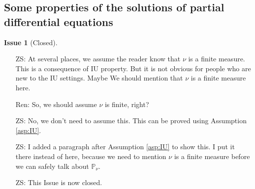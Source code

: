 \documentclass[12pt,a4paper]{amsart}
\numberwithin{equation}{section}
\theoremstyle{plain}
\theoremstyle{definition}
\newtheorem{iss}{Issue}
\begin{document}
\subsection{Some properties of the solutions of partial differential equations}
\begin{iss}[Closed]~
  \begin{itemize}
  \item[ZS:]
At several places, we assume the reader know that $\nu$ is a finite measure. This is a consequence of IU property. But it is not obvious for people who are new to the IU settings. Maybe We should mention that $\nu$ is a finite measure here.

\item[Ren:] 
So, we should assume  $\nu$ is finite, right?
\item[ZS:]
No, we don't need to assume this. 
This can be proved using Assumption \ref{asp:IU}.
\item[ZS:]
I added a paragraph after Assumption \ref{asp:IU} to show this.
I put it there instead of here, because we need to mention $\nu$ is a finite measure before we can safely talk about $\mathbb P_\nu$.
\item[ZS:]
This Issue is now closed.
  \end{itemize}
\end{iss}
\end{document}
